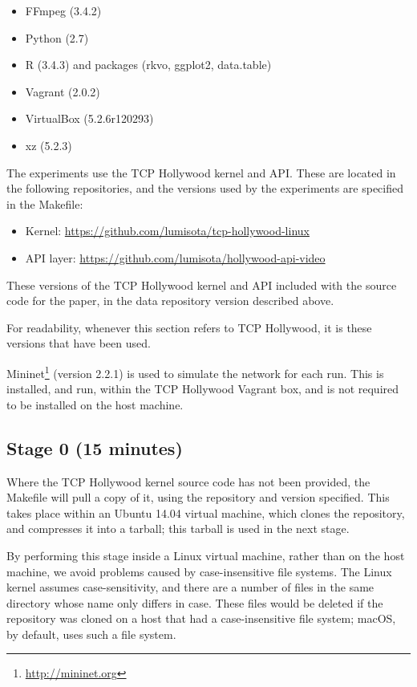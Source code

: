 \documentclass[sigconf]{acmart}
\begin{document}
\begin{itemize}
\item FFmpeg (3.4.2)
\item Python (2.7)
\item R (3.4.3) and packages (rkvo, ggplot2, data.table)
\item Vagrant (2.0.2)
\item VirtualBox (5.2.6r120293)
\item xz (5.2.3)
\end{itemize}

The experiments use the TCP Hollywood kernel and API. These are located in the following
repositories, and the versions used by the experiments are specified in the Makefile:

\begin{itemize}
\item Kernel: \url{https://github.com/lumisota/tcp-hollywood-linux} 
\item API layer: \url{https://github.com/lumisota/hollywood-api-video} 
\end{itemize}

These versions of the TCP Hollywood kernel and API included with the source code for the
paper, in the data repository version described above.

For readability, whenever this section refers to TCP Hollywood, it is these versions that
have been used.

Mininet\footnote{\url{http://mininet.org}} (version 2.2.1) is used to simulate the network
for each run. This is installed, and run, within the TCP Hollywood Vagrant box, and is
not required to be installed on the host machine.

\subsection*{Stage 0 (15 minutes)}

Where the TCP Hollywood kernel source code has not been provided, the Makefile will pull
a copy of it, using the repository and version specified. This takes place within an
Ubuntu 14.04 virtual machine, which clones the repository, and compresses it into a 
tarball; this tarball is used in the next stage.

By performing this stage inside a Linux virtual machine, rather than on the host
machine, we avoid problems caused by case-insensitive file systems. The Linux kernel
assumes case-sensitivity, and there are a number of files in the same directory whose
name only differs in case. These files would be deleted if the repository was cloned on
a host that had a case-insensitive file system; macOS, by default, uses such a file system.
\end{document}
